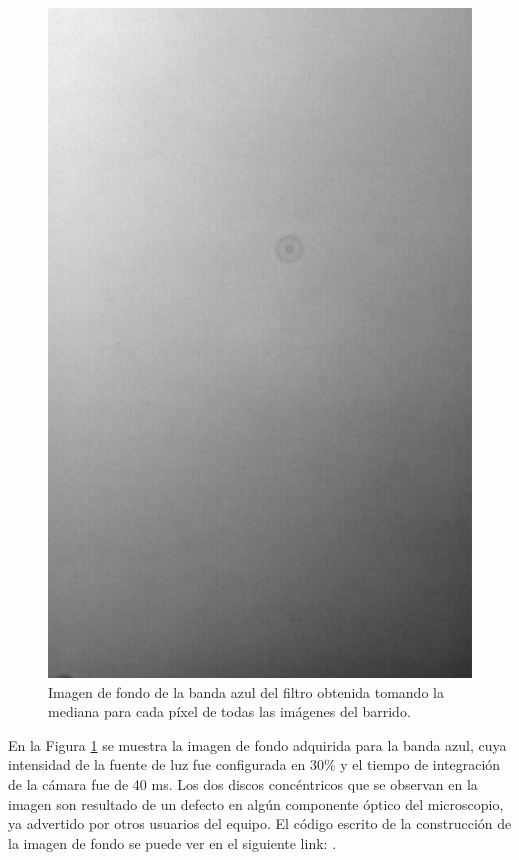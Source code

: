 \begin{enumerate}
	\begin{figure}[H]
		\centering
		\includegraphics[scale=0.2]{Figs/defectosZEISS/bg_celeste.png}
		\caption{Imagen de fondo de la banda azul del filtro obtenida tomando la mediana para cada píxel de todas las imágenes del barrido.}
		\label{fig:bgcel}
	\end{figure}
	\hspace{0.5cm}En la Figura \ref{fig:bgcel} se muestra la imagen de fondo adquirida para la banda azul, cuya intensidad de la fuente de luz fue configurada en 30$\%$ y el tiempo de integración de la cámara fue de 40 ms. Los dos discos concéntricos que se observan en la imagen son resultado de un defecto en algún componente óptico del microscopio, ya advertido por otros usuarios del equipo. El código escrito de la construcción de la imagen de fondo se puede ver en el siguiente link: \href{https://github.com/jrr1984/defects_analysis/blob/master/MAIN/bg.py}{\faGithub}.
	

\end{enumerate}
